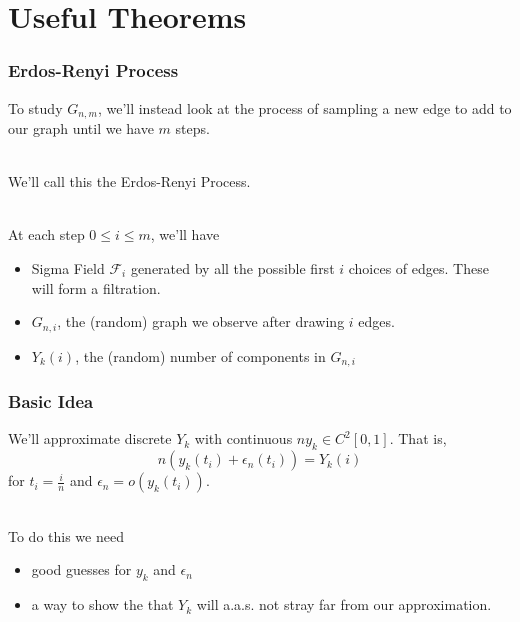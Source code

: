 \documentclass{beamer}
\begin{document}
\section{Useful Theorems}

\begin{frame}
\frametitle{Erdos-Renyi Process}

To study \(G_{n, m}\), we'll instead look at the process of sampling a new edge to add to our graph until we have \(m\) steps. \\~\
\pause

We'll call this the Erdos-Renyi Process. \\~\ \pause

At each step \(0 \leq i \leq m\), we'll have
\begin{itemize}
    \item Sigma Field \(\mathcal{F}_{i}\) generated by all the possible first \(i\) choices of edges. These will form a filtration. \pause
    \item \(G_{n, i}\), the (random) graph we observe after drawing \(i\) edges. \pause
    \item \(Y_{k}(i)\), the (random) number of components in \(G_{n, i}\)
\end{itemize}

\end{frame}


\begin{frame}
\frametitle{Basic Idea}

We'll approximate discrete \(Y_{k}\) with continuous \(ny_{k} \in C^{2}[0, 1]\). That is,
\[n(y_{k}(t_{i}) + \epsilon_{n}(t_{i})) = Y_{k}(i)\]
for \(t_{i} = \frac{i}{n}\) and \(\epsilon_{n} = o(y_{k}(t_{i})) \). \\~\

\pause
To do this we need
\begin{itemize}
  \item good guesses for \(y_{k}\) and \(\epsilon_{n}\) \pause
  \item a way to show the that \(Y_{k}\) will a.a.s. not stray far from our approximation.
\end{itemize}


\end{frame}
\end{document}
